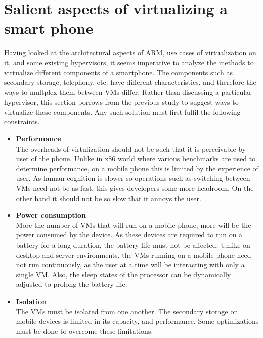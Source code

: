 \documentclass[seminar,twoside]{iitbreport}
\begin{document}
 \section{Salient aspects of virtualizing a smart phone}
 Having looked at the architectural aspects of ARM, use cases of virtualization on it, and some existing hypervisors, it seems imperative to analyze the methods to 
 virtualize different components of a smartphone. The components such as secondary storage, telephony, etc. have different characteristics, and therefore the ways to multplex
 them between VMs differ. Rather than discussing a particular hypervisor, this section borrows from the previous study to suggest ways to virtualize these
 components. Any such solution must first fulfil the following constraints.
 \begin{itemize}
  \item \textbf{Performance}\\
  The overheads of virtulization should not be such that it is perceivable by user of the phone. Unlike in x86 world where various benchmarks are used to determine performance,
  on a mobile phone this is limited by the experience of user. As human cognition is slower so operations such as switching between VMs need not be as fast, this gives
  developers some more headroom. On the other hand it should not be so slow that it annoys the user.
  \item \textbf{Power consumption}\\
  More the number of VMs that will run on a mobile phone, more will be the power consumed by the device. As these devices are required to run on a battery for a long duration,
  the battery life must not be affected. Unlike on desktop and server environments, the VMs running on a mobile phone need not run continuously, as the user at a time will be interacting
  with only a single VM. Also, the sleep states of the processor can be dynamically adjusted to prolong the battery life.
  \item \textbf{Isolation}\\
  The VMs must be isolated from one another. The secondary storage on mobile devices is limited in its capacity, and performance. Some optimizations must be done to
  overcome these limitations.
 \end{itemize}

 
\end{document}
